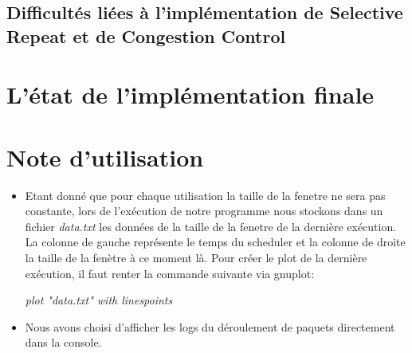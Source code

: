 \documentclass[a4paper, 12pt]{article}
\begin{document}
	\subsection{Difficultés liées à l'implémentation de Selective Repeat et de Congestion Control}
		\begin{itemize}
			
		\end{itemize}

\section{L'état de l'implémentation finale}
	

\section{Note d'utilisation}
	\begin{itemize}
		\item Etant donné que pour chaque utilisation la taille de la fenetre ne sera pas constante, lors de l'exécution de notre programme nous stockons dans un fichier \textit{data.txt} les données de la taille de la fenetre de la dernière exécution.
	La colonne de gauche représente le temps du scheduler et la colonne de droite la taille de la fenètre à ce moment là.
	Pour créer le plot de la dernière exécution, il faut renter la commande suivante via gnuplot:
	\begin{center}
		\textit{plot "data.txt" with linespoints}
	\end{center} 
	\item Nous avons choisi d'afficher les logs du déroulement de paquets directement dans la console.
	\end{itemize}
	
\end{document}
